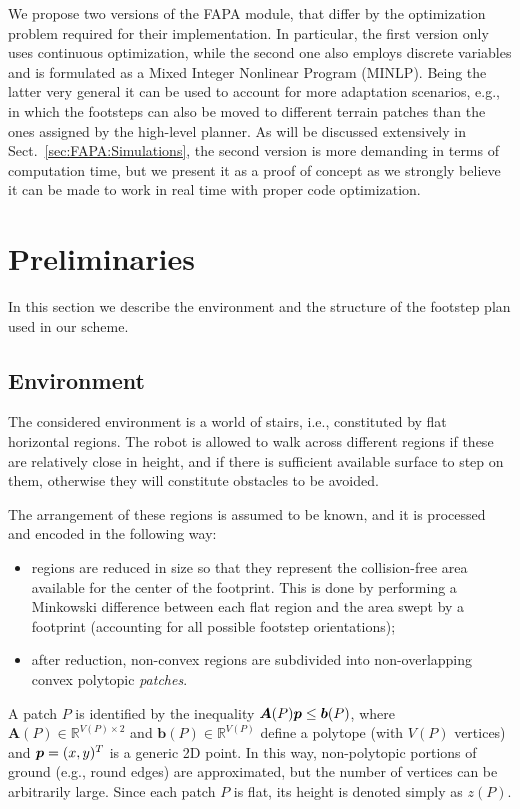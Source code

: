 We propose two versions of the FAPA module, that differ by the optimization problem required for their implementation. In particular, the first version only uses continuous optimization, while the second one also employs discrete variables and is formulated as a Mixed Integer Nonlinear Program (MINLP). Being the latter very general it can be used to account for more adaptation scenarios, e.g., in which the footsteps can also be moved to different terrain patches than the ones assigned by the high-level planner. As will be discussed extensively in Sect.~\ref{sec:FAPA:Simulations}, the second version is more demanding in terms of computation time, but we present it as a proof of concept as we strongly believe it can be made to work in real time with proper code optimization.

\section{Preliminaries}
\label{sec:FAPA:Preliminaries}

In this section we describe the environment and the structure of the footstep plan used in our scheme.

\subsection{Environment}

The considered environment is a world of stairs, i.e., constituted by flat horizontal regions. The robot is allowed to walk across different regions if these are relatively close in height, and if there is sufficient available surface to step on them, otherwise they will constitute obstacles to be avoided.

The arrangement of these regions is assumed to be known, and it is processed and encoded in the following way:
\begin{itemize}
\item regions are reduced in size so that they represent the collision-free area available for the center of the footprint. This is done by performing a Minkowski difference between each flat region and the area swept by a footprint (accounting for all possible footstep orientations);
\item after reduction, non-convex regions are subdivided into non-overlapping convex polytopic {\em patches}.
\end{itemize}
A patch $P$ is identified by the inequality ${\bm{A}}(P) {\bm{p}} \le {\bm{b}}(P)$, where $\bm{A}(P) \in \mathbb{R}^{V(P) \times 2}$ and $\bm{b}(P) \in \mathbb{R}^{V(P)} $ define a polytope (with $V(P)$ vertices) and ${\bm{p}} = (x, y)^T$ is a generic 2D point. 
In this way, non-polytopic portions of ground (e.g., round edges) are approximated, but the number of vertices can be arbitrarily large.
Since each patch $P$ is flat, its height is denoted simply as $z(P)$.


